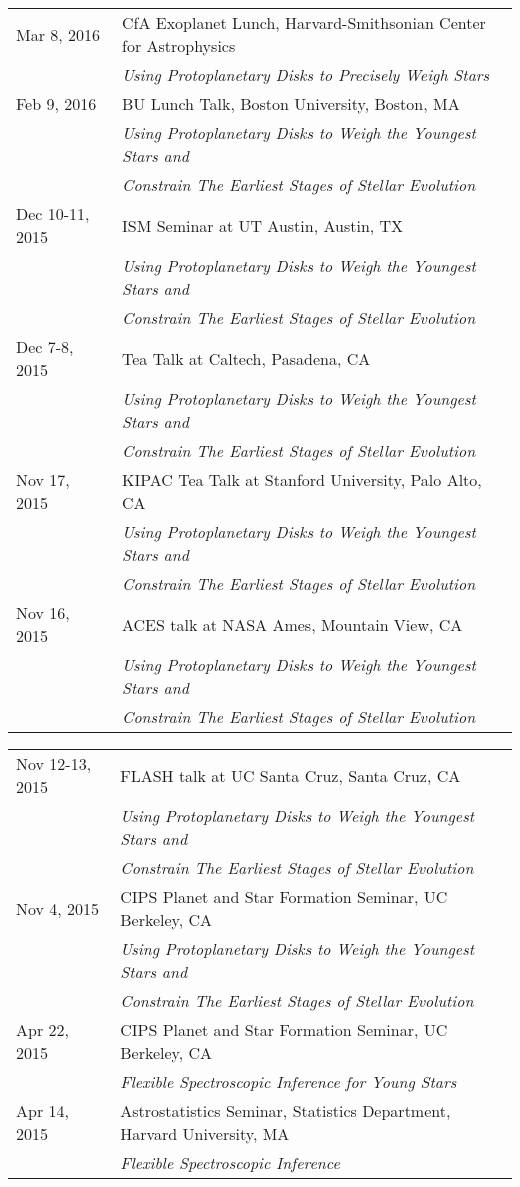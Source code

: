 \documentclass[10pt]{article}
\newcommand{\rowskip}{1.2mm}
\begin{document}
\begin{tabular*}{\textwidth}{@{\hspace{10pt}}p{1.2in}l}
  Mar 8, 2016 & CfA Exoplanet Lunch, Harvard-Smithsonian Center for Astrophysics \\
  & \emph{Using Protoplanetary Disks to Precisely Weigh Stars} \\[\rowskip]
  Feb 9, 2016 & BU Lunch Talk, Boston University, Boston, MA \\
  & \emph{Using Protoplanetary Disks to Weigh the Youngest Stars and} \\
  & \emph{Constrain The Earliest Stages of Stellar Evolution} \\[\rowskip]
  Dec 10-11, 2015 & ISM Seminar at UT Austin, Austin, TX \\
  & \emph{Using Protoplanetary Disks to Weigh the Youngest Stars and} \\
  & \emph{Constrain The Earliest Stages of Stellar Evolution} \\[\rowskip]
  Dec 7-8, 2015 & Tea Talk at Caltech, Pasadena, CA \\
  & \emph{Using Protoplanetary Disks to Weigh the Youngest Stars and} \\
  & \emph{Constrain The Earliest Stages of Stellar Evolution} \\[\rowskip]
  Nov 17, 2015 & KIPAC Tea Talk at Stanford University, Palo Alto, CA \\
  & \emph{Using Protoplanetary Disks to Weigh the Youngest Stars and} \\
  & \emph{Constrain The Earliest Stages of Stellar Evolution} \\[\rowskip]
  Nov 16, 2015 & ACES talk at NASA Ames, Mountain View, CA \\
  & \emph{Using Protoplanetary Disks to Weigh the Youngest Stars and} \\
  & \emph{Constrain The Earliest Stages of Stellar Evolution} \\[\rowskip]
\end{tabular*}
\begin{tabular*}{\textwidth}{@{\hspace{10pt}}p{1.2in}l}
  Nov 12-13, 2015 & FLASH talk at UC Santa Cruz, Santa Cruz, CA \\
  & \emph{Using Protoplanetary Disks to Weigh the Youngest Stars and} \\
  & \emph{Constrain The Earliest Stages of Stellar Evolution} \\[\rowskip]
  Nov 4, 2015 & CIPS Planet and Star Formation Seminar, UC Berkeley, CA\\
  & \emph{Using Protoplanetary Disks to Weigh the Youngest Stars and} \\
  & \emph{Constrain The Earliest Stages of Stellar Evolution} \\[\rowskip]
  Apr 22, 2015 & CIPS Planet and Star Formation Seminar, UC Berkeley, CA\\
  & \emph{Flexible Spectroscopic Inference for Young Stars} \\[\rowskip]
  Apr 14, 2015 & Astrostatistics Seminar, Statistics Department, Harvard University, MA \\
  & \emph{Flexible Spectroscopic Inference} \\[\rowskip]
\end{tabular*}
\end{document}
